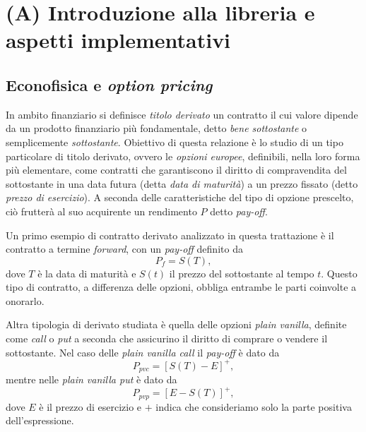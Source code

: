 \chapter{(A) Introduzione alla libreria e aspetti implementativi}
\section{Econofisica e \textit{option pricing}} \label{sec:introduction_econophysic_option_pricing}
In ambito finanziario si definisce \textit{titolo derivato} un contratto il cui valore dipende da un prodotto finanziario più fondamentale, detto \textit{bene sottostante} o semplicemente \textit{sottostante}. Obiettivo di questa relazione è lo studio di un tipo particolare di titolo derivato, ovvero le \textit{opzioni europee}, definibili, nella loro forma più elementare, come contratti che garantiscono il diritto di compravendita del sottostante in una data futura (detta \textit{data di maturità}) a un prezzo fissato (detto \textit{prezzo di esercizio}). A seconda delle caratteristiche del tipo di opzione prescelto, ciò frutterà al suo acquirente un rendimento $P$ detto \textit{pay-off}.

Un primo esempio di contratto derivato analizzato in questa trattazione è il contratto a termine \textit{forward}, con un \textit{pay-off} definito da
\begin{equation}
    P_f = S(T),
    \label{eq:forward_pay-off}
\end{equation}
dove $T$ è la data di maturità e $S(t)$ il prezzo del sottostante al tempo $t$. Questo tipo di contratto, a differenza delle opzioni, obbliga entrambe le parti coinvolte a onorarlo.

Altra tipologia di derivato studiata è quella delle opzioni \textit{plain vanilla}, definite come \textit{call} o \textit{put} a seconda che assicurino il diritto di comprare o vendere il sottostante. Nel caso delle \textit{plain vanilla call} il \textit{pay-off} è dato da
\begin{equation}
    P_{pvc} = {\left[S(T)-E\right]}^+,
    \label{eq:pvc_pay-off}
\end{equation}
mentre nelle \textit{plain vanilla put} è dato da
\begin{equation}
    P_{pvp} = {\left[E-S(T)\right]}^+,
    \label{eq:pvp_pay-off}
\end{equation}
dove $E$ è il prezzo di esercizio e $+$ indica che consideriamo solo la parte positiva dell'espressione.

